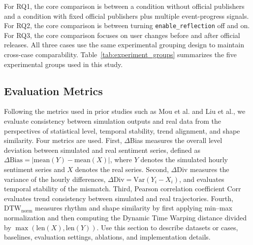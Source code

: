 For RQ1, the core comparison is between a condition without official publishers and a condition with fixed official publishers plus multiple event-progress signals. For RQ2, the core comparison is between turning \texttt{enable\_reflection} off and on. For RQ3, the core comparison focuses on user changes before and after official releases. All three cases use the same experimental grouping design to maintain cross-case comparability. Table~\ref{tab:experiment_groups} summarizes the five experimental groups used in this study.



\subsection{Evaluation Metrics}

Following the metrics used in prior studies such as Mou et al. and Liu et al., we evaluate consistency between simulation outputs and real data from the perspectives of statistical level, temporal stability, trend alignment, and shape similarity. Four metrics are used. First, \(\Delta\)Bias measures the overall level deviation between simulated and real sentiment series, defined as \(\Delta\mathrm{Bias} = |\mathrm{mean}(Y) - \mathrm{mean}(X)|\), where \(Y\) denotes the simulated hourly sentiment series and \(X\) denotes the real series. Second, \(\Delta\)Div measures the variance of the hourly differences, \(\Delta\mathrm{Div} = \mathrm{Var}(Y_i - X_i)\), and evaluates temporal stability of the mismatch. Third, Pearson correlation coefficient \(\mathrm{Corr}\) evaluates trend consistency between simulated and real trajectories. Fourth, \(\mathrm{DTW}_{\mathrm{norm}}\) measures rhythm and shape similarity by first applying min--max normalization and then computing the Dynamic Time Warping distance divided by \(\max(\mathrm{len}(X), \mathrm{len}(Y))\).
Use this section to describe datasets or cases, baselines, evaluation settings, ablations, and implementation details.
